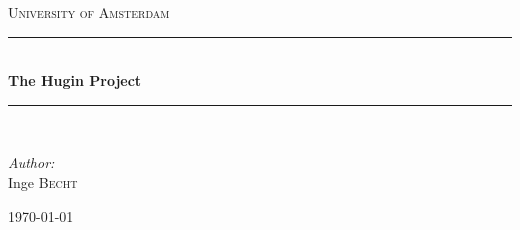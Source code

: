 \documentclass[12pt]{article} %
\begin{document}

\begin{titlepage}

\newcommand{\HRule}{\rule{\linewidth}{0.5mm}} %

\center %

\textsc{\LARGE University of Amsterdam}\\[1.5cm] %

\HRule \\[0.4cm]
{ \huge \bfseries The Hugin Project}\\[0.4cm] %
\HRule \\[1.5cm]

\begin{minipage}{0.4\textwidth}
\begin{flushleft} \large
\emph{Author:}\\
Inge \textsc{Becht} %
\end{flushleft}
\end{minipage}

{\large \today}\\[3cm] %


\vfill %

\end{titlepage}


\tableofcontents %

\newpage %

\end{document}
